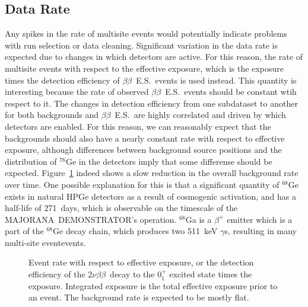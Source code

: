 \documentclass[notitlepage,rmp,aps,10pt]{revtex4-1}
\newcommand{\MJ}{M{\footnotesize AJORANA}}
\newcommand{\Demo}{D{\footnotesize EMON\-STRAT\-OR}}
\newcommand{\MJD}{\MJ\ \Demo}
\newcommand{\bb}{${\beta \beta}$}
\newcommand{\tnbb}{${2 \nu \beta \beta}$}
\newcommand{\bbes}{\bb~E.S.}
\newcommand{\iso}[2]{$^{#1}$#2}
\newcommand{\Ge}[1]{\iso{#1}{Ge}}
\newcommand{\SP}[3]{$#1^{#2}_{#3}$}
\newcommand{\msmd}{multi-site event}
\begin{document}
\subsection{Data Rate}
Any spikes in the rate of multisite events would potentially indicate problems with run selection or data cleaning.
Significant variation in the data rate is expected due to changes in which detectors are active.
For this reason, the rate of multisite events with respect to the effective exposure, which is the exposure times the detection efficiency of \bbes\ events is used instead.
This quantity is interesting because the rate of observed \bbes\ events should be constant wtih respect to it.
The changes in detection efficiency from one subdataset to another for both backgrounds and \bbes\ are highly correlated and driven by which detectors are enabled.
For this reason, we can reasonably expect that the backgrounds should also have a nearly constant rate with respect to effective exposure, although differences between background source positions and the distribution of \Ge{76} in the detectors imply that some differense should be expected.
Figure~\ref{fig:eventrate} indeed shows a slow reduction in the overall background rate over time.
One possible explanation for this is that a significant quantity of \Ge{68} exists in natural HPGe detectors as a result of cosmogenic activation, and has a half-life of 271~days, which is observable on the timescale of the \MJD's operation.
\iso{68}{Ga} is a $\beta^+$ emitter which is a part of the \Ge{68} decay chain, which produces two 511~keV $\gamma$s, resulting in many \msmd events.
\begin{figure}[ht]
  \centering
  \caption[Event rate in both modules with respect to effective exposure]{\label{fig:eventrate}
    Event rate with respect to effective exposure, or the detection efficiency of the \tnbb\ decay to the \SP{0}{+}{1} excited state times the exposure. Integrated exposure is the total effective exposure prior to an event. The background rate is expected to be mostly flat.
  }
\end{figure}
\end{document}

